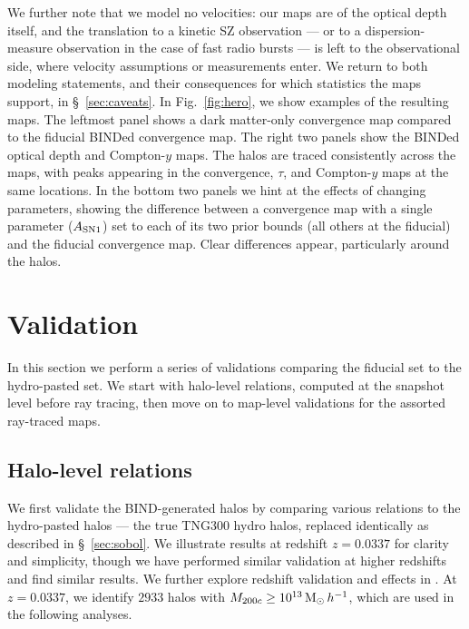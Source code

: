 \documentclass[linenumbers,trackchanges, twocolumn]{aastex701}
\begin{document}
We further note that we model no velocities: our maps are of the optical depth itself, and the translation to a kinetic SZ observation — or to a dispersion-measure observation in the case of fast radio bursts — is left to the observational side, where velocity assumptions or measurements enter. We return to both modeling statements, and their consequences for which statistics the maps support, in \S~\ref{sec:caveats}.
In Fig.~\ref{fig:hero}, we show examples of the resulting maps. The leftmost panel shows a dark matter-only convergence map compared to the fiducial BINDed convergence map. The right two panels show the BINDed optical depth and Compton-$y$ maps. The halos are traced consistently across the maps, with peaks appearing in the convergence, $\tau$, and Compton-$y$ maps at the same locations. In the bottom two panels we hint at the effects of changing parameters, showing the difference between a convergence map with a single parameter ($A_{\rm SN1}$) set to each of its two prior bounds (all others at the fiducial) and the fiducial convergence map. Clear differences appear, particularly around the halos.

 
\section{Validation}\label{sec:validation}

In this section we perform a series of validations comparing the fiducial set to the hydro-pasted set. We start with halo-level relations, computed at the snapshot level before ray tracing, then move on to map-level validations for the assorted ray-traced maps.
 
\subsection{Halo-level relations}\label{sec:val_halo}
We first validate the BIND-generated halos by comparing various relations to the hydro-pasted halos --- the true TNG300 hydro halos, replaced identically as described in \S~\ref{sec:sobol}. We illustrate results at redshift $z=0.0337$ for clarity and simplicity, though we have performed similar validation at higher redshifts and find similar results. We further explore redshift validation and effects in \citet{Lee-2026b}. At $z=0.0337$, we identify $2933$ halos with $M_{200c}\geq10^{13}\,{\rm M}_\odot\,h^{-1}$, which are used in the following analyses.
 
\end{document}
